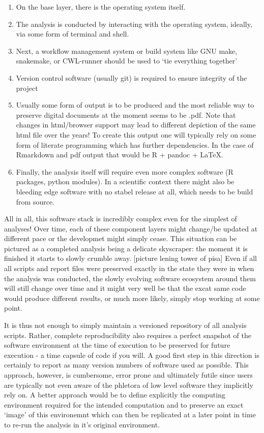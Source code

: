 \documentclass[]{book}
\providecommand{\tightlist}{%
  \setlength{\itemsep}{0pt}\setlength{\parskip}{0pt}}
\begin{document}
\begin{enumerate}
\def\labelenumi{\arabic{enumi}.}
\tightlist
\item
  On the base layer, there is the operating system itself.
\item
  The analysis is conducted by interacting with the operating system,
  ideally, via some form of terminal and shell.
\item
  Next, a workflow management system or build system like GNU make,
  snakemake, or CWL-runner should be used to `tie everything together'
\item
  Version control software (usually git) is required to ensure integrity
  of the project
\item
  Usually some form of output is to be produced and the most reliable
  way to preserve digital documents at the moment seems to be .pdf. Note
  that changes in html/browser support may lead to different depiction
  of the same html file over the years! To create this output one will
  typically rely on some form of literate programming which has further
  dependencies. In the case of Rmarkdown and pdf output that would be R
  + pandoc + LaTeX.
\item
  Finally, the analysis itself will require even more complex software
  (R packages, python modules). In a scientific context there might also
  be bleeding edge software with no stabel release at all, which needs
  to be build from source.
\end{enumerate}

All in all, this software stack is incredibly complex even for the
simplest of analyses! Over time, each of these component layers might
change/be updated at different pace or the developmet might simply
cease. This situation can be pictured as a completed analysis being a
delicate skyscraper: the moment it is finished it starts to slowly
crumble away. {[}picture lening tower of pisa{]} Even if all all scripts
and report files were preserved exactly in the state they were in when
the analysis was conducted, the slowly evolving software ecosystem
around them will still change over time and it might very well be that
the excat same code would produce different results, or much more
likely, simply stop working at some point.

It is thus not enough to simply maintain a versioned repository of all
analysis scripts. Rather, complete reproducibility also requires a
perfect snapshot of the software environment at the time of execution to
be preserved for future execution - a time capsule of code if you will.
A good first step in this direction is certainly to report as many
version numbers of software used as possible. This approach, however, is
cumbersome, error prone and ultimately futile since users are typically
not even aware of the phletora of low level software they implicitly
rely on. A better approach would be to define explicitly the computing
environment required for the intended computation and to preserve an
exact `image' of this environemnt which can then be replicated at a
later point in time to re-run the analysis in it's original environment.
\end{document}
